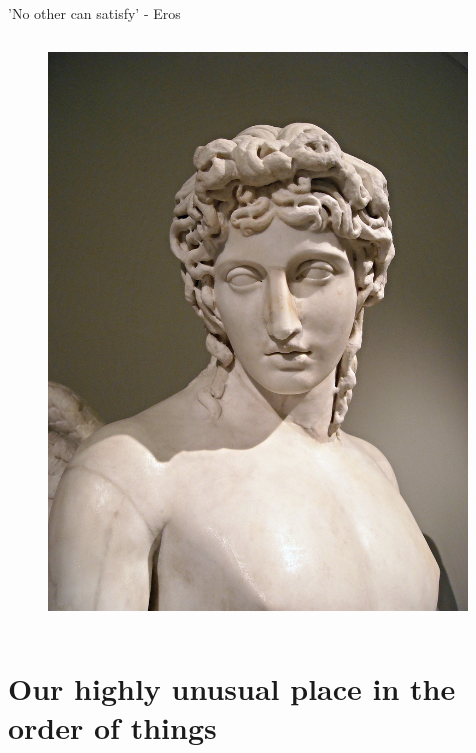 \documentclass[xcolor=dvipsnames]{beamer}
\begin{document}
\begin{frame}[fragile]{'No other can satisfy' - Eros}
  \begin{columns}[T] %
    \begin{column}{0.6\textwidth}
      \begin{figure}[H]
        \centering
        \includegraphics[width=0.99\textwidth]{eros}
      \end{figure}
    \end{column}%
  \end{columns}
\end{frame}


\section{Our highly unusual place in the order of things}
\end{document}
